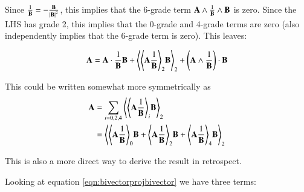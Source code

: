 \documentclass{article}      %
\newcommand{\gpgrade}[2] {{\left\langle{{#1}}\right\rangle}_{#2}}
\newcommand{\gpgradezero}[1] {\gpgrade{#1}{0}}
\newcommand{\gpgradetwo}[1] {\gpgrade{#1}{2}}
\newcommand{\gpgradefour}[1] {\gpgrade{#1}{4}}
\begin{document}
Since $\frac{1}{\mathbf{B}} = -\frac{\mathbf{B}}{{\lvert{\mathbf{B}}\rvert}^2}$, this implies that the 6-grade term $\mathbf{A} \wedge \frac{1}{\mathbf{B}} \wedge \mathbf{B}$ is zero.  Since the LHS has grade 2, this
implies that the 0-grade and 4-grade terms are zero (also independently implies that the 6-grade term is zero).  This leaves:

\begin{equation}\label{eqn:bivectorprojbivector}
\BA
= 
\BA \cdot \inv{\BB} \BB \\
+\gpgradetwo{\gpgradetwo{\BA\inv\BB} \BB}
+\left(\BA \wedge \inv{\BB}\right) \cdot \BB 
\end{equation}

This could be written somewhat more symmetrically as
\begin{align*}
\BA
&=\sum_{i=0,2,4}\gpgradetwo{\gpgrade{\BA \inv{\BB}}{i} \BB} \\
&= \gpgradetwo{ \gpgradezero{\BA \inv{\BB}} \BB +\gpgradetwo{\BA \inv{\BB}} \BB +\gpgradefour{\BA \inv{\BB}} \BB } \\
\end{align*}

This is also a more direct way to derive the result in retrospect.

Looking at equation \ref{eqn:bivectorprojbivector} we have three terms:
\end{document}
